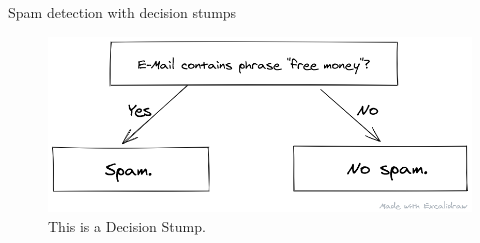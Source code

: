 \begin{frame}{Spam detection with decision stumps}
    \begin{figure}
        \centering
        \includegraphics[width=\textwidth]{img/spam_classifier.png}
        \caption{This is a Decision Stump.}
    \end{figure}
\end{frame}